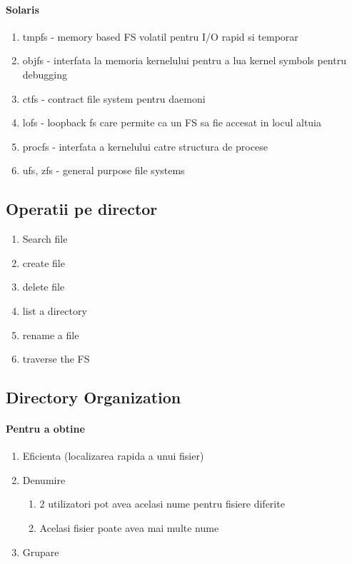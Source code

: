 \documentclass{article}
\begin{document}
\paragraph*{Solaris}
\begin{enumerate}
    \item tmpfs - memory based FS volatil pentru I/O rapid si temporar
    \item objfs - interfata la memoria kernelului pentru a lua kernel symbols pentru debugging
    \item ctfs - contract file system pentru daemoni
    \item lofs - loopback fs care permite ca un FS sa fie accesat in locul altuia
    \item procfs - interfata a kernelului catre structura de procese
    \item ufs, zfs - general purpose file systems
\end{enumerate}

\subsection*{Operatii pe director}
\begin{enumerate}
    \item Search file
    \item create file
    \item delete file
    \item list a directory
    \item rename a file
    \item traverse the FS
\end{enumerate}

\subsection*{Directory Organization}
\paragraph*{Pentru a obtine}
\begin{enumerate}
    \item Eficienta (localizarea rapida a unui fisier)
    \item Denumire
          \begin{enumerate}
              \item 2 utilizatori pot avea acelasi nume pentru fisiere diferite
              \item Acelasi fisier poate avea mai multe nume
          \end{enumerate}
    \item Grupare
\end{enumerate}
\end{document}
